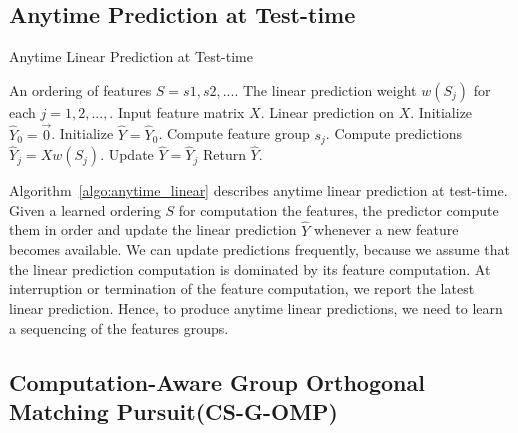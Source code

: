 \subsection{Anytime Prediction at Test-time}

\begin{algorithm}[tb]
\caption{Anytime Linear Prediction at Test-time}
\label{algo:anytime_linear}
\begin{algorithmic}[1]
 An ordering of features $S = s1, s2, ...$. 
The linear prediction weight $w(S_j)$ for each $j=1,2,...,$.
Input feature matrix $X$.
 Linear prediction on $X$.
\STATE Initialize $\hat{Y}_0 = \vec{0}$. 
\STATE Initialize $\hat{Y} = \hat{Y}_0$. 
	\STATE Compute feature group $s_j$.
	\STATE Compute predictions $\hat{Y}_j = Xw(S_j)$.
	\STATE Update $\hat{Y} = \hat{Y}_j$
\ENDFOR
\STATE Return $\hat{Y}$. 
\end{algorithmic}
\end{algorithm}

Algorithm~\ref{algo:anytime_linear} describes anytime linear prediction at test-time. 
Given a learned ordering $S$ for computation the features, the predictor compute them in order
and update the linear prediction $\hat{Y}$ whenever a new feature becomes available. 
We can update predictions frequently, because we assume that the linear prediction computation
is dominated by its feature computation.
At interruption or termination of the feature computation, we report the latest linear prediction. 
Hence, to produce anytime linear predictions, we need to learn a sequencing of the features groups.


\subsection{Computation-Aware Group Orthogonal Matching Pursuit(CS-G-OMP)}


